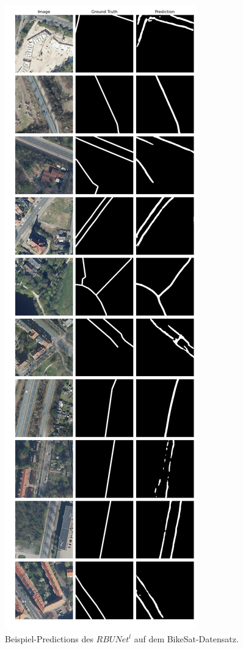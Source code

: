 \begin{figure}
	\centering
	\includegraphics[width=.41\textwidth]{Bilder/Samples-BikeSat/rbunet-l.png} 
	\caption{Beispiel-Predictions des $RBUNet^l$ auf dem BikeSat-Datensatz.}
	\label{fig:bikesat-samples-rbunet-l}
\end{figure}

